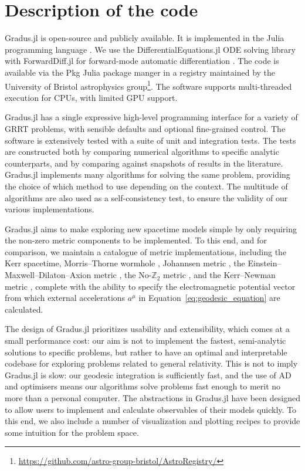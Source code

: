 \documentclass[fleqn,usenatbib]{mnras}
\newcommand{\software}[1]{{\sc #1}}
\newcommand{\Gradus}{\software{Gradus.jl}\xspace}
\begin{document}
\section{Description of the code}
\label{sec:description-of-code}

\Gradus is open-source and publicly available. It is implemented in the Julia
programming language \citep{Bezanson_Julia_A_fresh_2017}. We use the
DifferentialEquations.jl ODE solving library with ForwardDiff.jl for
forward-mode automatic differentiation
\citep{rackauckas_differential_2017,RevelsLubinPapamarkou2016}. The code is
available via the \software{Pkg} Julia package manger in a registry maintained
by the University of Bristol astrophysics
group\footnote{\url{https://github.com/astro-group-bristol/AstroRegistry/}}. The
software supports multi-threaded execution for CPUs, with limited GPU support.

\Gradus has a single expressive high-level programming interface for a variety
of GRRT problems, with sensible defaults and optional fine-grained control. The
software is extensively tested with a suite of unit and integration tests. The
tests are constructed both by comparing numerical algorithms to specific
analytic counterparts, and by comparing against snapshots of results in the
literature. \Gradus implements many algorithms for solving the same problem,
providing the choice of which method to use depending on the context. The
multitude of algorithms are also used as a self-consistency test, to ensure the
validity of our various implementations.

\Gradus aims to make exploring new spacetime models simple by only requiring the
non-zero metric components to be implemented. To this end, and for comparison, we
maintain a catalogue of metric implementations, including the Kerr spacetime,
Morris--Thorne wormhole \citep{morris_wormholes_1988}, Johannsen metric
\cite{johannsen_regular_2013}, the Einstein--Maxwell--Dilaton--Axion metric
\citep{garcia_class_1995}, the No-$\mathbb{Z}_2$ metric
\citep{chen_observational_2024}, and the Kerr--Newman
metric \citep[e.g.][]{hackmann_charged_2013}, complete with the ability to
specify the electromagnetic potential vector from which external accelerations
$a^\mu$ in Equation~\eqref{eq:geodesic_equation} are calculated.

The design of \Gradus prioritizes usability and extensibility, which comes at a
small performance cost: our aim is not to implement the fastest, semi-analytic
solutions to specific problems, but rather to have an optimal and interpretable
codebase for exploring problems related to general relativity.  This is not to
imply \Gradus is slow: our geodesic integration is sufficiently fast, and the
use of AD and optimisers means our algorithms solve problems fast enough to
merit no more than a personal computer. The abstractions in \Gradus have been
designed to allow users to implement and calculate observables of their models
quickly. To this end, we also include a number of visualization and plotting
recipes to provide some intuition for the problem space.
\end{document}
